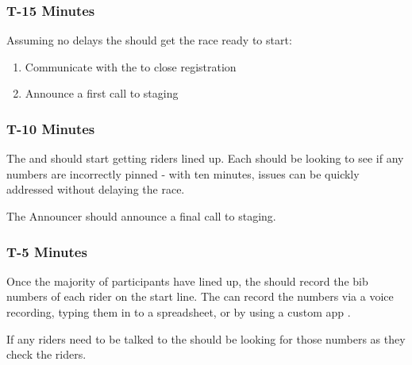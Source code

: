 \subsubsection{T-15 Minutes}

Assuming no delays%
the  should get the race ready to start:

\begin{enumerate}
  \item Communicate with the  to close registration%
  \item Announce a first call to staging%
\end{enumerate}

\subsubsection{T-10 Minutes}

The  and  should start getting riders lined up.
Each should be looking to see if any numbers are incorrectly pinned - with ten minutes, issues can be quickly addressed
without delaying the race.

The Announcer should announce a final call to staging.

\subsubsection{T-5 Minutes}

Once the majority of participants have lined up, the  should record the bib numbers
of each rider on the start line.
The  can record the numbers via a voice recording, typing them in to a spreadsheet,
or by using a custom app%
.

If any riders need to be talked to%
the  should be looking for those numbers as they check the riders.

